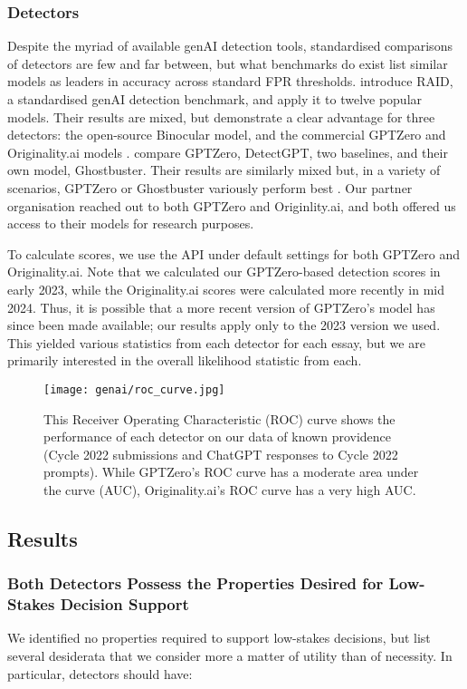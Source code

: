 \subsubsection{Detectors}\label{sssec:detectors}
Despite the myriad of available genAI detection tools, standardised comparisons of detectors are few and far between, but what benchmarks do exist list similar models as leaders in accuracy across standard FPR thresholds. \textcite{dugan_raid_2024} introduce RAID, a standardised genAI detection benchmark, and apply it to twelve popular models. Their results are mixed, but demonstrate a clear advantage for three detectors: the open-source Binocular model, and the commercial GPTZero and Originality.ai models \cite{dugan_raid_2024}. \textcite{verma_ghostbuster_2023} compare GPTZero, DetectGPT, two baselines, and their own model, Ghostbuster. Their results are similarly mixed but, in a variety of scenarios, GPTZero or Ghostbuster variously perform best \cite{verma_ghostbuster_2023} . Our partner organisation reached out to both GPTZero and Originlity.ai, and both offered us access to their models for research purposes.

To calculate scores, we use the API under default settings for both GPTZero and Originality.ai. Note that we calculated our GPTZero-based detection scores in early 2023, while the Originality.ai scores were calculated more recently in mid 2024. Thus, it is possible that a more recent version of GPTZero's model has since been made available; our results apply only to the 2023 version we used. This yielded various statistics from each detector for each essay, but we are primarily interested in the overall likelihood statistic from each.

\begin{figure}[htb]
  \centering
  \texttt{[image: genai/roc\_curve.jpg]}
  \caption{This Receiver Operating Characteristic (ROC) curve shows the performance of each detector on our data of known providence (Cycle 2022 submissions and ChatGPT responses to Cycle 2022 prompts). While GPTZero's ROC curve has a moderate area under the curve (AUC), Originality.ai's ROC curve has a very high AUC.}
  \label{fig:roc_auc}
\end{figure}

\subsection{Results}
\subsubsection{Both Detectors Possess the Properties Desired for Low-Stakes Decision Support}
We identified no properties required to support low-stakes decisions, but list several desiderata that we consider more a matter of utility than of necessity. In particular, detectors should have:

